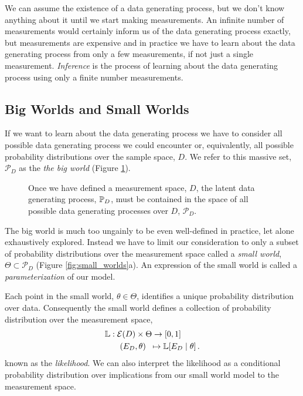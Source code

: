 We can assume the existence of a data generating process, 
but we don't know anything about it until we start making 
measurements.  An infinite number of measurements would 
certainly inform us of the data generating process exactly,
but measurements are expensive and in practice we have
to learn about the data generating process from only a few
measurements, if not just a single measurement. \emph{Inference}
is the process of learning about the data generating process
using only a finite number measurements.  

\subsection{Big Worlds and Small Worlds}

If we want to learn about the data generating process we have
to consider all possible data generating process we could
encounter or, equivalently, all possible probability distributions
over the sample space, $D$.  We refer to this massive set, 
$\mathcal{P}_{D}$ as the \emph{the big world} (Figure \ref{fig:big_world}).  

\begin{figure*}
\centering
{}
\caption{Once we have defined a measurement space, $D$, the latent data
generating process, $\mathbb{P}_{D}$, must be contained in the space of all 
possible data generating processes over $D$, $\mathcal{P}_{D}$.
}
\label{fig:big_world}
\end{figure*}

The big world is much too ungainly to be even well-defined in 
practice, let alone exhaustively explored.  Instead we have to limit 
our consideration to only a subset of probability distributions over 
the measurement space called a \emph{small world}, $\Theta \subset
\mathcal{P}_{D}$ (Figure \ref{fig:small_worlds}a).  An expression
of the small world is called a \emph{parameterization} of our model.

Each point in the small world, $\theta \in \Theta$, identifies a unique 
probability distribution over data.  Consequently the small world defines 
a collection of probability distribution over the measurement space,
%
\begin{align*}
\mathbb{L}
&:  \mathcal{E} \! \left( D \right)  \times \Theta \rightarrow \left[0, 1 \right] \\
&\quad \left( E_{D}, \theta \right) \;\; \mapsto 
\mathbb{L} \! \left[ E_{D} \mid \theta \right].
\end{align*}
%
known as the \emph{likelihood}.  We can also interpret the likelihood
as a conditional probability distribution over implications from our
small world model to the measurement space.

